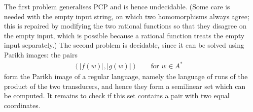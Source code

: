 {
    The first problem generalises PCP and is hence undecidable. (Some care is needed with the empty input string, on which two homomorphisms always agree; this is repaired by modifying the two rational functions so that they disagree on the empty input, which is possible because a rational function treats the empty input separately.) The second problem is decidable, since it can be solved using Parikh images: the pairs
    \begin{align*}
    (|f(w)|, |g(w)|) \qquad \text{for $w \in A^*$}
    \end{align*}
    form the Parikh image of a regular language, namely the language of runs of the product of the two transducers, and hence they form a semilinear set which can be computed. It remains to check if this set contains a pair with two equal coordinates.
}

